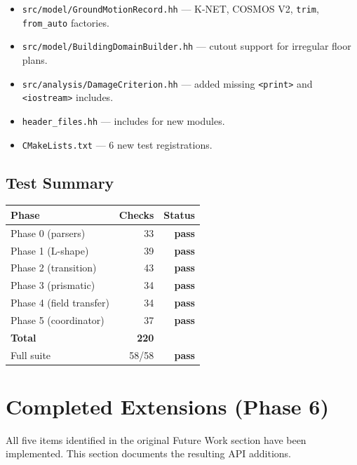 \begin{itemize}
  \item \texttt{src/model/GroundMotionRecord.hh} — K-NET, COSMOS V2,
    \texttt{trim}, \texttt{from\_auto} factories.
  \item \texttt{src/model/BuildingDomainBuilder.hh} — cutout support for
    irregular floor plans.
  \item \texttt{src/analysis/DamageCriterion.hh} — added missing
    \texttt{<print>} and \texttt{<iostream>} includes.
  \item \texttt{header\_files.hh} — includes for new modules.
  \item \texttt{CMakeLists.txt} — 6 new test registrations.
\end{itemize}

\subsection{Test Summary}

\begin{center}
\begin{tabular}{lrr}
\hline
\textbf{Phase} & \textbf{Checks} & \textbf{Status} \\
\hline
Phase 0 (parsers)       & 33 & \textbf{pass} \\
Phase 1 (L-shape)       & 39 & \textbf{pass} \\
Phase 2 (transition)    & 43 & \textbf{pass} \\
Phase 3 (prismatic)     & 34 & \textbf{pass} \\
Phase 4 (field transfer)& 34 & \textbf{pass} \\
Phase 5 (coordinator)   & 37 & \textbf{pass} \\
\hline
\textbf{Total}          & \textbf{220} & \\
\hline
Full suite              & 58/58 & \textbf{pass} \\
\hline
\end{tabular}
\end{center}


\section{Completed Extensions (Phase 6)}
\label{sec:phase6_extensions}

All five items identified in the original Future Work section have been
implemented.  This section documents the resulting API additions.

